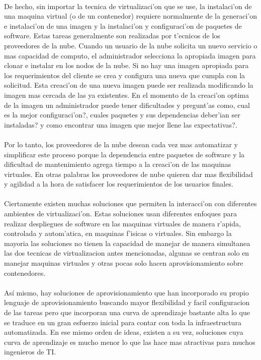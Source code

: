 \\
De hecho, sin importar la tecnica de virtualizaci'on que se use, la instalaci'on de una maquina virtual (o de un contenedor) requiere normalmente de la generaci'on e instalaci'on de una imagen y la instalaci'on y configuraci'on de paquetes de software. Estas tareas generalmente son realizadas por t'ecnicos de los proveedores de la nube. Cuando un usuario de la nube solicita un nuevo servicio o mas capacidad de computo, el administrador selecciona la apropiada imagen para clonar e instalar en los nodos de la nube. Si no hay una imagen apropiada para los requerimientos del cliente se crea y configura una nueva que cumpla con la solicitud. Esta creaci'on de una nueva imagen puede ser realizada modificando la imagen mas cercada de las ya existentes. En el momento de la creaci'on optima de la imagen un administrador puede tener dificultades y pregunt'as como, cual es la mejor configuraci'on?, cuales paquetes y sus dependencias deber'ian ser instaladas? y como encontrar una imagen que mejor llene las expectativas?.\\
\\
Por lo tanto, los proveedores de la nube desean cada vez mas automatizar y simplificar este proceso porque la dependencia entre paquetes de software y la dificultad de mantenimiento agrega tiempo a la creaci'on de las maquinas virtuales. En otras palabras los proveedores de nube quieren dar mas flexibilidad y agilidad a la hora de satisfacer los requerimientos de los usuarios finales.\\
\\
Ciertamente existen muchas soluciones que permiten la interacci'on con diferentes ambientes de virtualizaci'on. Estas soluciones usan diferentes enfoques para realizar despliegues de software en las maquinas virtuales de manera r'apida, controlada y autom'atica, en maquinas f'isicas o virtuales. Sin embargo la mayoria las soluciones no tienen la capacidad de manejar de manera simultanea las dos tecnicas de virtualizacion antes mencionadas, algunas se centran solo en manejar maquinas virtuales y otras pocas solo hacen aprovisionamiento sobre contenedores.\\
\\
Así mismo, hay soluciones de aprovisionamiento que han incorporado su propio lenguaje de aprovisionamiento buscando mayor flexibilidad y facil configuracion de las tareas pero que incorporan una curva de aprendizaje bastante alta lo que se traduce en un gran esfuerzo inicial para contar con toda la infraestructura automatizada. En ese mismo orden de ideas, existen a su vez, soluciones cuya curva de aprendizaje es mucho menor lo que las hace mas atractivas para muchos ingenieros de TI.\\

